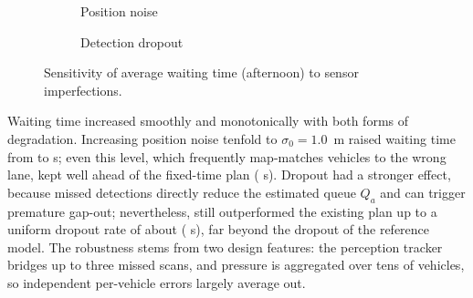 \begin{figure}[H]
\centering
\begin{subfigure}[b]{0.48\textwidth}
\centering
{}
\caption{Position noise}
\end{subfigure}\hfill
\begin{subfigure}[b]{0.48\textwidth}
\centering
{}
\caption{Detection dropout}
\end{subfigure}
\caption{Sensitivity of \prism{} average waiting time (afternoon) to sensor imperfections.}
\label{fig:sens}
\end{figure}

Waiting time increased smoothly and monotonically with both forms of degradation. Increasing position noise tenfold to $\sigma_0 = 1.0$~m raised waiting time from  to  s; even this level, which frequently map-matches vehicles to the wrong lane, kept \prism{} well ahead of the fixed-time plan ( s). Dropout had a stronger effect, because missed detections directly reduce the estimated queue $Q_a$ and can trigger premature gap-out; nevertheless, \prism{} still outperformed the existing plan up to a uniform dropout rate of about  ( s), far beyond the  dropout of the reference model. The robustness stems from two design features: the perception tracker bridges up to three missed scans, and pressure is aggregated over tens of vehicles, so independent per-vehicle errors largely average out.

